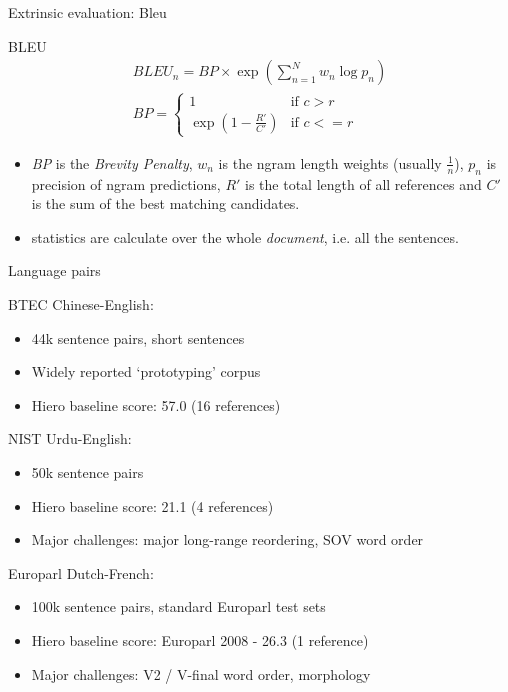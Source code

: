 \documentclass{beamer}
\newenvironment{unpacked_itemize}{
\begin{itemize}
  \setlength{\itemsep}{10pt}
  \setlength{\parskip}{0pt}
  \setlength{\parsep}{0pt}
}{\end{itemize}}
\begin{document}
\begin{frame}[t]{Extrinsic evaluation: Bleu}
\begin{exampleblock}{BLEU}
\Large
\begin{align}
\nonumber BLEU_n = BP \times \exp{\left( \sum_{n=1}^{N} w_n \log{p_n} \right) }\\
\nonumber BP = \left\{ 
  \begin{array}{ll} 
    1 & \mbox{if $c > r$}  \\
    \exp{(1-\frac{R'}{C'})} & \mbox{if $c <= r$}
  \end{array} \right.
\end{align}
\end{exampleblock}
\begin{itemize}
\item {\em BP} is the {\em Brevity Penalty}, $w_n$ is the ngram length weights (usually $\frac{1}{n}$), $p_n$ is precision of ngram predictions, $R'$ is the total length of all references and $C'$ is the sum of the best matching candidates.
\item statistics are calculate over the whole {\em document}, i.e. all the sentences.
\end{itemize}
\end{frame}



\begin{frame}[t]{Language pairs}
\begin{unpacked_itemize}
\item BTEC Chinese-English:
  \begin{itemize}
  \item 44k sentence pairs, short sentences
  \item Widely reported `prototyping' corpus
  \item Hiero baseline score: 57.0 (16 references)
  \end{itemize}
\item NIST Urdu-English:
  \begin{itemize}
  \item 50k sentence pairs
  \item Hiero baseline score: 21.1 (4 references)
  \item Major challenges: major long-range reordering, SOV word order
  \end{itemize}
\item Europarl Dutch-French:
  \begin{itemize}
  \item 100k sentence pairs, standard Europarl test sets
  \item Hiero baseline score: Europarl 2008 - 26.3 (1 reference)
  \item Major challenges: V2 / V-final word order, morphology
  \end{itemize}
\end{unpacked_itemize}
\end{frame}
\end{document}
